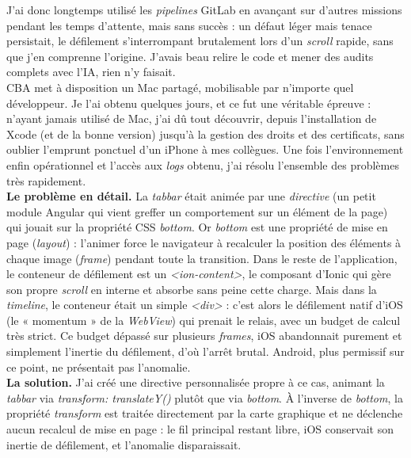 \documentclass{article}
\begin{document}
J'ai donc longtemps utilisé les \textit{pipelines} GitLab en avançant sur d'autres missions pendant les temps d'attente, mais sans succès : un défaut léger mais tenace persistait, le défilement s'interrompant brutalement lors d'un \textit{scroll} rapide, sans que j'en comprenne l'origine. J'avais beau relire le code et mener des audits complets avec l'IA, rien n'y faisait.\\

CBA met à disposition un Mac partagé, mobilisable par n'importe quel développeur. Je l'ai obtenu quelques jours, et ce fut une véritable épreuve : n'ayant jamais utilisé de Mac, j'ai dû tout découvrir, depuis l'installation de Xcode (et de la bonne version) jusqu'à la gestion des droits et des certificats, sans oublier l'emprunt ponctuel d'un iPhone à mes collègues. Une fois l'environnement enfin opérationnel et l'accès aux \textit{logs} obtenu, j'ai résolu l'ensemble des problèmes très rapidement.\\

\textbf{Le problème en détail.} La \textit{tabbar} était animée par une \textit{directive} (un petit module Angular qui vient greffer un comportement sur un élément de la page) qui jouait sur la propriété CSS \textit{bottom}. Or \textit{bottom} est une propriété de mise en page (\textit{layout}) : l'animer force le navigateur à recalculer la position des éléments à chaque image (\textit{frame}) pendant toute la transition. Dans le reste de l'application, le conteneur de défilement est un \textit{<ion-content>}, le composant d'Ionic qui gère son propre \textit{scroll} en interne et absorbe sans peine cette charge. Mais dans la \textit{timeline}, le conteneur était un simple \textit{<div>} : c'est alors le défilement natif d'iOS (le « momentum » de la \textit{WebView}) qui prenait le relais, avec un budget de calcul très strict. Ce budget dépassé sur plusieurs \textit{frames}, iOS abandonnait purement et simplement l'inertie du défilement, d'où l'arrêt brutal. Android, plus permissif sur ce point, ne présentait pas l'anomalie.\\

\textbf{La solution.} J'ai créé une directive personnalisée propre à ce cas, animant la \textit{tabbar} via \textit{transform: translateY()} plutôt que via \textit{bottom}. À l'inverse de \textit{bottom}, la propriété \textit{transform} est traitée directement par la carte graphique et ne déclenche aucun recalcul de mise en page : le fil principal restant libre, iOS conservait son inertie de défilement, et l'anomalie disparaissait.\\
\end{document}
